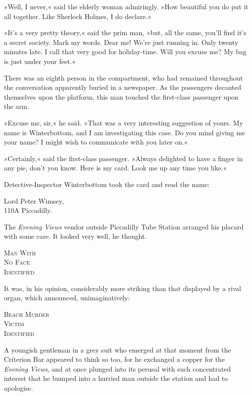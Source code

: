 »Well, I never,« said the elderly woman admiringly. »How beautiful you do put it all together. Like Sherlock Holmes, I do declare.«

»It's a very pretty theory,« said the prim man, »but, all the same, you'll find it's a secret society. Mark my words. Dear me! We're just running in. Only twenty minutes late. I call that very good for holiday-time. Will you excuse me? My bag is just under your feet.«

There was an eighth person in the compartment, who had remained throughout the conversation apparently buried in a newspaper. As the passengers decanted themselves upon the platform, this man touched the first-class passenger upon the arm.

»Excuse me, sir,« he said. »That was a very interesting suggestion of yours. My name is Winterbottom, and I am investigating this case. Do you mind giving me your name? I might wish to communicate with you later on.«

»Certainly,« said the first-class passenger. »Always delighted to have a finger in any pie, don't you know. Here is my card. Look me up any time you like.«

Detective-Inspector Winterbottom took the card and read the name:
\begin{center}
Lord Peter Wimsey,\\
110A Piccadilly.
\end{center}

The \textit{Evening Views} vendor outside Piccadilly Tube Station arranged his placard with some care. It looked very well, he thought.

\begin{center}\scshape
Man With\\
No Face\\
Identified
\end{center}

It was, in his opinion, considerably more striking than that displayed by a rival organ, which announced, unimaginatively:
\begin{center}\scshape
Beach Murder\\
Victim\\
Identified
\end{center}

A youngish gentleman in a grey suit who emerged at that moment from the Criterion Bar appeared to think so too, for he exchanged a copper for the \textit{Evening Views}, and at once plunged into its perusal with such concentrated interest that he bumped into a hurried man outside the station and had to apologise.

